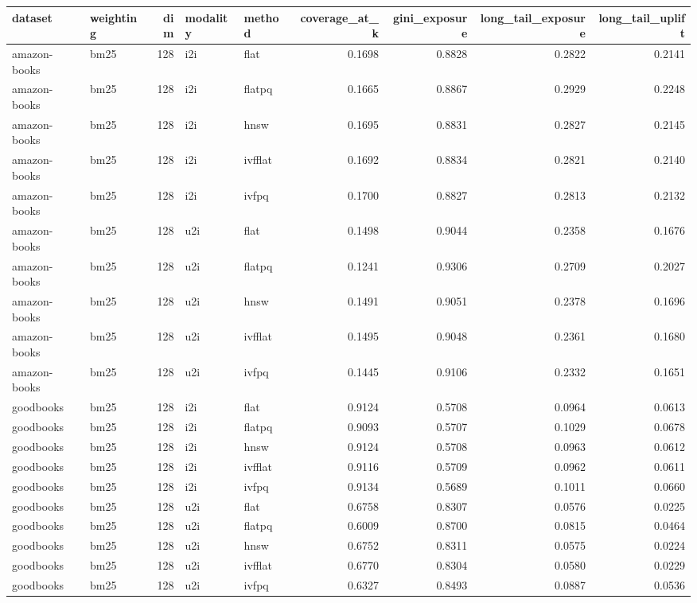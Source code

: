 \begin{tabular}{llrllrrrr}
\toprule
dataset & weighting & dim & modality & method & coverage_at_k & gini_exposure & long_tail_exposure & long_tail_uplift \\
\midrule
amazon-books & bm25 & 128 & i2i & flat & 0.1698 & 0.8828 & 0.2822 & 0.2141 \\
amazon-books & bm25 & 128 & i2i & flatpq & 0.1665 & 0.8867 & 0.2929 & 0.2248 \\
amazon-books & bm25 & 128 & i2i & hnsw & 0.1695 & 0.8831 & 0.2827 & 0.2145 \\
amazon-books & bm25 & 128 & i2i & ivfflat & 0.1692 & 0.8834 & 0.2821 & 0.2140 \\
amazon-books & bm25 & 128 & i2i & ivfpq & 0.1700 & 0.8827 & 0.2813 & 0.2132 \\
amazon-books & bm25 & 128 & u2i & flat & 0.1498 & 0.9044 & 0.2358 & 0.1676 \\
amazon-books & bm25 & 128 & u2i & flatpq & 0.1241 & 0.9306 & 0.2709 & 0.2027 \\
amazon-books & bm25 & 128 & u2i & hnsw & 0.1491 & 0.9051 & 0.2378 & 0.1696 \\
amazon-books & bm25 & 128 & u2i & ivfflat & 0.1495 & 0.9048 & 0.2361 & 0.1680 \\
amazon-books & bm25 & 128 & u2i & ivfpq & 0.1445 & 0.9106 & 0.2332 & 0.1651 \\
goodbooks & bm25 & 128 & i2i & flat & 0.9124 & 0.5708 & 0.0964 & 0.0613 \\
goodbooks & bm25 & 128 & i2i & flatpq & 0.9093 & 0.5707 & 0.1029 & 0.0678 \\
goodbooks & bm25 & 128 & i2i & hnsw & 0.9124 & 0.5708 & 0.0963 & 0.0612 \\
goodbooks & bm25 & 128 & i2i & ivfflat & 0.9116 & 0.5709 & 0.0962 & 0.0611 \\
goodbooks & bm25 & 128 & i2i & ivfpq & 0.9134 & 0.5689 & 0.1011 & 0.0660 \\
goodbooks & bm25 & 128 & u2i & flat & 0.6758 & 0.8307 & 0.0576 & 0.0225 \\
goodbooks & bm25 & 128 & u2i & flatpq & 0.6009 & 0.8700 & 0.0815 & 0.0464 \\
goodbooks & bm25 & 128 & u2i & hnsw & 0.6752 & 0.8311 & 0.0575 & 0.0224 \\
goodbooks & bm25 & 128 & u2i & ivfflat & 0.6770 & 0.8304 & 0.0580 & 0.0229 \\
goodbooks & bm25 & 128 & u2i & ivfpq & 0.6327 & 0.8493 & 0.0887 & 0.0536 \\

\end{tabular}
